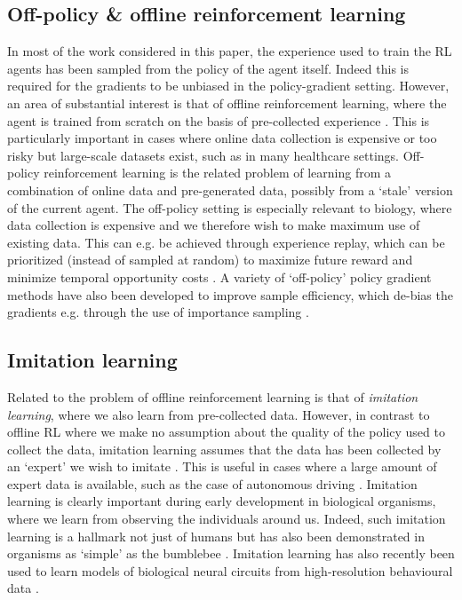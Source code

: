 \subsection{Off-policy \& offline reinforcement learning}
\label{sec:off-policy}
In most of the work considered in this paper, the experience used to train the RL agents has been sampled from the policy of the agent itself.
Indeed this is required for the gradients to be unbiased in the policy-gradient setting.
However, an area of substantial interest is that of offline reinforcement learning, where the agent is trained from scratch on the basis of pre-collected experience \citep{levine2020offline}.
This is particularly important in cases where online data collection is expensive or too risky but large-scale datasets exist, such as in many healthcare settings.
Off-policy reinforcement learning is the related problem of learning from a combination of online data and pre-generated data, possibly from a `stale' version of the current agent.
The off-policy setting is especially relevant to biology, where data collection is expensive and we therefore wish to make maximum use of existing data.
This can e.g. be achieved through experience replay, which can be prioritized (instead of sampled at random) to maximize future reward and minimize temporal opportunity costs \citep{mattar2018prioritized, agrawal2022temporal,schaul2015prioritized}.
A variety of `off-policy' policy gradient methods have also been developed to improve sample efficiency, which de-bias the gradients e.g. through the use of importance sampling \citep{espeholt2018impala,jie2010connection,peshkin2002learning,haarnoja2018soft}.

\subsection{Imitation learning}
\label{sec:imitation}
Related to the problem of offline reinforcement learning is that of \emph{imitation learning}, where we also learn from pre-collected data.
However, in contrast to offline RL where we make no assumption about the quality of the policy used to collect the data, imitation learning assumes that the data has been collected by an `expert' we wish to imitate \citep{levine2020offline}.
This is useful in cases where a large amount of expert data is available, such as the case of autonomous driving \citep{pan2017agile}.
Imitation learning is clearly important during early development in biological organisms, where we learn from observing the individuals around us.
Indeed, such imitation learning is a hallmark not just of humans but has also been demonstrated in organisms as `simple' as the bumblebee \citep{loukola2017bumblebees}.
Imitation learning has also recently been used to learn models of biological neural circuits from high-resolution behavioural data \citep{aldarondo2024virtual}.


